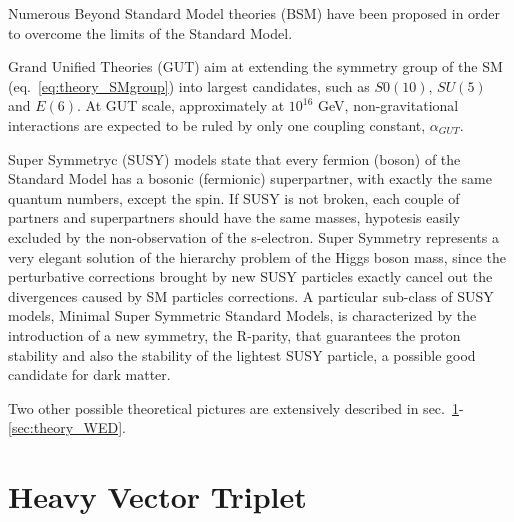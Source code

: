 Numerous Beyond Standard Model theories (BSM) have been proposed in order to overcome the limits of the Standard Model.

Grand Unified Theories (GUT) aim at extending the symmetry group of the SM (eq.~\ref{eq:theory_SMgroup}) into largest candidates, such as $S0(10)$, $SU(5)$ and $E(6)$. At GUT scale, approximately at $10^{16}$ GeV, non-gravitational interactions are expected to be ruled by only one coupling constant, $\alpha_{GUT}$. %

Super Symmetryc (SUSY) models state that every fermion (boson) of the Standard Model has a bosonic (fermionic) superpartner, with exactly the same quantum numbers, except the spin. If SUSY is not broken, each couple of partners and superpartners should have the same masses, hypotesis easily excluded by the non-observation of the s-electron. Super Symmetry represents a very elegant solution of the hierarchy problem of the Higgs boson mass, since the perturbative corrections brought by new SUSY particles exactly cancel out the divergences caused by SM particles corrections. A particular sub-class of SUSY models, Minimal Super Symmetric Standard Models, is characterized by the introduction of a new symmetry, the R-parity, that guarantees the proton stability and also the stability of the lightest SUSY particle, a possible good candidate for dark matter.

Two other possible theoretical pictures are extensively described in sec.~\ref{sec:theory_HVT}-\ref{sec:theory_WED}.

\newpage

\section{Heavy Vector Triplet}
\label{sec:theory_HVT}

